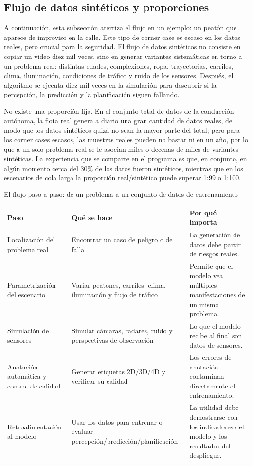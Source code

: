 \documentclass[a4paper]{article}
\begin{document}
\subsection{Flujo de datos sintéticos y proporciones}

A continuación, esta subsección aterriza el flujo en un ejemplo: un peatón que aparece de improviso en la calle. Este tipo de corner case es escaso en los datos reales, pero crucial para la seguridad. El flujo de datos sintéticos no consiste en copiar un video diez mil veces, sino en generar variantes sistemáticas en torno a un problema real: distintas edades, complexiones, ropa, trayectorias, carriles, clima, iluminación, condiciones de tráfico y ruido de los sensores. Después, el algoritmo se ejecuta diez mil veces en la simulación para descubrir si la percepción, la predicción y la planificación siguen fallando.

No existe una proporción fija. En el conjunto total de datos de la conducción autónoma, la flota real genera a diario una gran cantidad de datos reales, de modo que los datos sintéticos quizá no sean la mayor parte del total; pero para los corner cases escasos, las muestras reales pueden no bastar ni en un año, por lo que a un solo problema real se le asocian miles o decenas de miles de variantes sintéticas. La experiencia que se comparte en el programa es que, en conjunto, en algún momento cerca del 30\% de los datos fueron sintéticos, mientras que en los escenarios de cola larga la proporción real/sintético puede superar 1:99 o 1:100.

\begin{knowledgebox}{El flujo paso a paso: de un problema a un conjunto de datos de entrenamiento}
\begin{tabularx}{\textwidth}{p{}p{}X}
\toprule
Paso & Qué se hace & Por qué importa \\
\midrule
Localización del problema real & Encontrar un caso de peligro o de falla & La generación de datos debe partir de riesgos reales. \\
Parametrización del escenario & Variar peatones, carriles, clima, iluminación y flujo de tráfico & Permite que el modelo vea múltiples manifestaciones de un mismo problema. \\
Simulación de sensores & Simular cámaras, radares, ruido y perspectivas de observación & Lo que el modelo recibe al final son datos de sensores. \\
Anotación automática y control de calidad & Generar etiquetas 2D/3D/4D y verificar su calidad & Los errores de anotación contaminan directamente el entrenamiento. \\
Retroalimentación al modelo & Usar los datos para entrenar o evaluar percepción/predicción/planificación & La utilidad debe demostrarse con los indicadores del modelo y los resultados del despliegue. \\
\bottomrule
\end{tabularx}
\end{knowledgebox}
\end{document}
